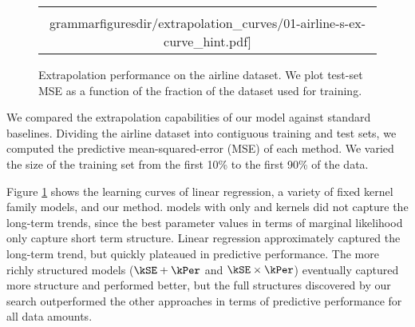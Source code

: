 \begin{figure}
\centering
\begin{tabular}{c}
\hspace{-0.5cm}
\texttt{[image: \\grammarfiguresdir/extrapolation\_curves/01-airline-s-ex-curve\_hint.pdf]}
\end{tabular}
\caption[Comparison of extrapolation performance]
{Extrapolation performance on the airline dataset.  We plot test-set MSE as a function of the fraction of the dataset used for training. 
}
\label{fig:extrapolation}
\end{figure}

We compared the extrapolation capabilities of our model against standard baselines\footnotemark.
Dividing the airline dataset into contiguous training and test sets, we computed the predictive mean-squared-error (MSE) of each method.
We varied the size of the training set from the first 10\% to the first 90\% of the data.

Figure \ref{fig:extrapolation} shows the learning curves of linear regression, a variety of fixed kernel family \gp{} models, and our method.  
\gp{} models with only \kSE{} and \kPer{} kernels did not capture the long-term trends, since the best parameter values in terms of \gp{} marginal likelihood only capture short term structure. 
Linear regression approximately captured the long-term trend, but quickly plateaued in predictive performance.
The more richly structured \gp{} models (${\kSE + \kPer}$ and ${\kSE \times \kPer}$) eventually captured more structure and performed better, but the full structures discovered by our search outperformed the other approaches in terms of predictive performance for all data amounts.

\footnotetext{
In one dimension, the predictive means of all baseline methods in table \ref{tbl:Regression Mean Squared Error} are identical to that of a \gp{} with an $\kSE{}$ kernel.}

\fi



